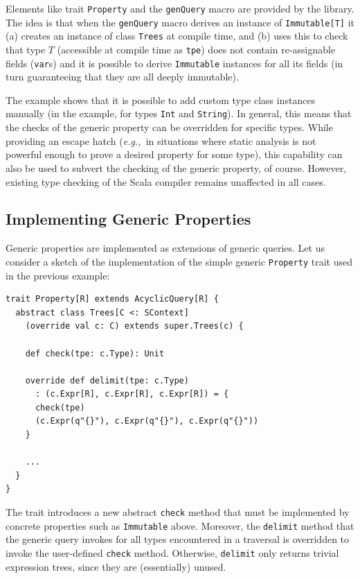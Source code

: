 \documentclass[preprint]{sigplanconf}
\newcommand{\eg}{{\em e.g.,~}}
\begin{document}
Elements like trait \verb|Property| and the \verb|genQuery| macro are provided
by the library. The idea is that when the \verb|genQuery| macro derives an
instance of \verb|Immutable[T]| it (a) creates an instance of class
\verb|Trees| at compile time, and (b) uses this to check that type $T$
(accessible at compile time as \verb|tpe|) does not contain re-assignable
fields (\verb|var|s) and it is possible to derive \verb|Immutable| instances
for all its fields (in turn guaranteeing that they are all deeply immutable).

The example shows that it is possible to add custom type class instances
manually (in the example, for types \verb|Int| and \verb|String|). In general,
this means that the checks of the generic property can be overridden for
specific types. While providing an escape hatch (\eg in situations where
static analysis is not powerful enough to prove a desired property for
some type), this capability can also be used to subvert the checking of the
generic property, of course. However, existing type checking of the Scala
compiler remains unaffected in all cases.


\subsection{Implementing Generic Properties}\label{sec:genprop-implementation}

Generic properties are implemented as extensions of generic queries. Let us
consider a sketch of the implementation of the simple generic \verb|Property|
trait used in the previous example:
\begin{lstlisting}
trait Property[R] extends AcyclicQuery[R] {
  abstract class Trees[C <: SContext]
    (override val c: C) extends super.Trees(c) {

    def check(tpe: c.Type): Unit

    override def delimit(tpe: c.Type)
      : (c.Expr[R], c.Expr[R], c.Expr[R]) = {
      check(tpe)
      (c.Expr(q"{}"), c.Expr(q"{}"), c.Expr(q"{}"))
    }

    ...
  }
}
\end{lstlisting}
\noindent
The trait introduces a new abstract \verb|check| method that must be
implemented by concrete properties such as \verb|Immutable| above. Moreover,
the \verb|delimit| method that the generic query invokes for all types
encountered in a traversal is overridden to invoke the user-defined
\verb|check| method. Otherwise, \verb|delimit| only returns trivial expression
trees, since they are (essentially) unused.
\end{document}

